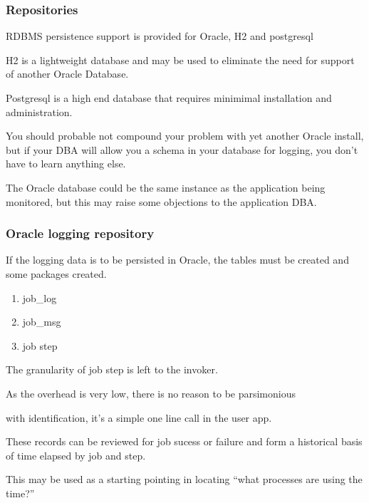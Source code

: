 \documentclass[letterpaper,10pt,english]{sphinxmanual}
\begin{document}
\subsubsection{Repositories}
\label{databaseLogging:repositories}
RDBMS persistence support is provided for Oracle, H2 and postgresql

H2 is a lightweight database and may be used to eliminate the need for
support of another Oracle Database.

Postgresql is a high end database that requires minimimal installation
and administration.

You should probable not compound your problem with yet another Oracle
install, but if your DBA will allow you a schema in your database for
logging, you don't have to learn anything else.

The Oracle database could be the same instance as the application being
monitored, but this may raise some objections to the application DBA.


\subsubsection{Oracle logging repository}
\label{databaseLogging:oracle-logging-repository}
If the logging data is to be persisted in Oracle, the tables must be
created and some packages created.
\begin{enumerate}
\item {} 
job\_log

\item {} 
job\_msg

\item {} 
job step

\end{enumerate}

\begin{DUlineblock}{0em}
\item[] The granularity of job step is left to the invoker.
\item[] As the overhead is very low, there is no reason to be parsimonious
\end{DUlineblock}

with identification, it's a simple one line call in the user app.

These records can be reviewed for job sucess or failure and form a
historical basis of time elapsed by job and step.

This may be used as a starting pointing in locating ``what processes are
using the time?''
\end{document}
